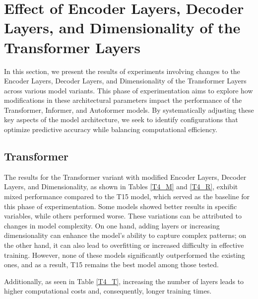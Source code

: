 \section{Effect of Encoder Layers, Decoder Layers, and Dimensionality of the Transformer Layers}

In this section, we present the results of experiments involving changes to the Encoder Layers, Decoder Layers, and Dimensionality of the Transformer Layers across various model variants. This phase of experimentation aims to explore how modifications in these architectural parameters impact the performance of the Transformer, Informer, and Autoformer models. By systematically adjusting these key aspects of the model architecture, we seek to identify configurations that optimize predictive accuracy while balancing computational efficiency.

\subsection{Transformer}
The results for the Transformer variant with modified Encoder Layers, Decoder Layers, and Dimensionality, as shown in Tables \ref{T4_M} and \ref{T4_R}, exhibit mixed performance compared to the T15 model, which served as the baseline for this phase of experimentation. Some models showed better results in specific variables, while others performed worse. These variations can be attributed to changes in model complexity. On one hand, adding layers or increasing dimensionality can enhance the model's ability to capture complex patterns; on the other hand, it can also lead to overfitting or increased difficulty in effective training. However, none of these models significantly outperformed the existing ones, and as a result, T15 remains the best model among those tested.

Additionally, as seen in Table \ref{T4_T}, increasing the number of layers leads to higher computational costs and, consequently, longer training times.


